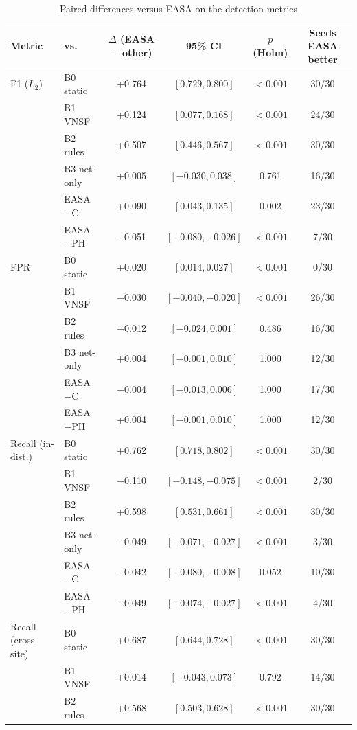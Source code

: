 \begin{table}[!t]
\caption{Paired differences versus EASA on the detection metrics}
\label{tab:paired}
\centering\scriptsize
\setlength{\tabcolsep}{4pt}
\begin{tabular}{llcccc}
\toprule
Metric & vs. & $\Delta$ (EASA $-$ other) & 95\% CI & $p$ (Holm) & Seeds EASA better \\
\midrule
F1 ($L_2$) & B0 static & +0.764 & $[0.729, 0.800]$ & $<0.001$ & 30/30 \\
 & B1 VNSF & +0.124 & $[0.077, 0.168]$ & $<0.001$ & 24/30 \\
 & B2 rules & +0.507 & $[0.446, 0.567]$ & $<0.001$ & 30/30 \\
 & B3 net-only & +0.005 & $[-0.030, 0.038]$ & 0.761 & 16/30 \\
 & EASA$-$C & +0.090 & $[0.043, 0.135]$ & 0.002 & 23/30 \\
 & EASA$-$PH & $-$0.051 & $[-0.080, -0.026]$ & $<0.001$ & 7/30 \\
\midrule
FPR & B0 static & +0.020 & $[0.014, 0.027]$ & $<0.001$ & 0/30 \\
 & B1 VNSF & $-$0.030 & $[-0.040, -0.020]$ & $<0.001$ & 26/30 \\
 & B2 rules & $-$0.012 & $[-0.024, 0.001]$ & 0.486 & 16/30 \\
 & B3 net-only & +0.004 & $[-0.001, 0.010]$ & 1.000 & 12/30 \\
 & EASA$-$C & $-$0.004 & $[-0.013, 0.006]$ & 1.000 & 17/30 \\
 & EASA$-$PH & +0.004 & $[-0.001, 0.010]$ & 1.000 & 12/30 \\
\midrule
Recall (in-dist.) & B0 static & +0.762 & $[0.718, 0.802]$ & $<0.001$ & 30/30 \\
 & B1 VNSF & $-$0.110 & $[-0.148, -0.075]$ & $<0.001$ & 2/30 \\
 & B2 rules & +0.598 & $[0.531, 0.661]$ & $<0.001$ & 30/30 \\
 & B3 net-only & $-$0.049 & $[-0.071, -0.027]$ & $<0.001$ & 3/30 \\
 & EASA$-$C & $-$0.042 & $[-0.080, -0.008]$ & 0.052 & 10/30 \\
 & EASA$-$PH & $-$0.049 & $[-0.074, -0.027]$ & $<0.001$ & 4/30 \\
\midrule
Recall (cross-site) & B0 static & +0.687 & $[0.644, 0.728]$ & $<0.001$ & 30/30 \\
 & B1 VNSF & +0.014 & $[-0.043, 0.073]$ & 0.792 & 14/30 \\
 & B2 rules & +0.568 & $[0.503, 0.628]$ & $<0.001$ & 30/30 \\

\end{tabular}
\end{table}

